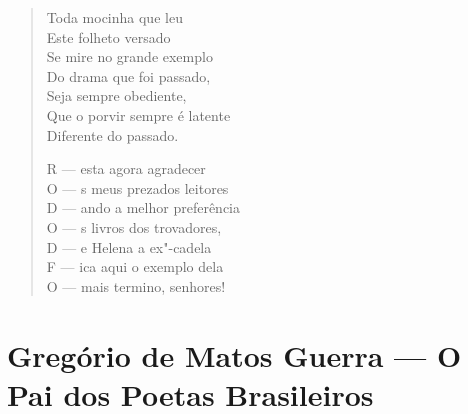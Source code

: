 \begin{verse}
Toda mocinha que leu \\
Este folheto versado \\
Se mire no grande exemplo \\
Do drama que foi passado, \\
Seja sempre obediente, \\
Que o porvir sempre é latente \\
Diferente do passado. 


R --- esta agora agradecer \\
O --- s meus prezados leitores \\
D --- ando a melhor preferência \\
O --- s livros dos trovadores, \\
D --- e Helena a ex"-cadela \\
F --- ica aqui o exemplo dela \\
O --- mais termino, senhores! 
\end{verse}

\chapter{Gregório de Matos Guerra --- O Pai dos Poetas Brasileiros }

